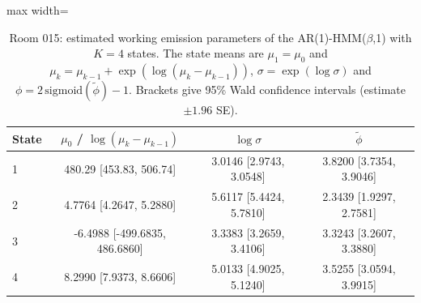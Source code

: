 \begin{table}[ht]
\centering
\begin{adjustbox}{max width=\textwidth}
\begin{tabular}{lccc}
\hline
State & $\mu_0$ / $\log(\mu_k - \mu_{k-1})$ & $\log \sigma$ & $\tilde{\phi}$ \\
\hline
1 & 480.29 [453.83, 506.74] & 3.0146 [2.9743, 3.0548] & 3.8200 [3.7354, 3.9046] \\
2 & 4.7764 [4.2647, 5.2880] & 5.6117 [5.4424, 5.7810] & 2.3439 [1.9297, 2.7581] \\
3 & -6.4988 [-499.6835, 486.6860] & 3.3383 [3.2659, 3.4106] & 3.3243 [3.2607, 3.3880] \\
4 & 8.2990 [7.9373, 8.6606] & 5.0133 [4.9025, 5.1240] & 3.5255 [3.0594, 3.9915] \\
\hline
\end{tabular}
\end{adjustbox}
\caption{Room 015: estimated working emission parameters of the AR(1)-HMM($\beta$,1) with $K=4$ states. The state means are $\mu_1 = \mu_0$ and $\mu_k = \mu_{k-1} + \exp(\log(\mu_k - \mu_{k-1}))$, $\sigma = \exp(\log \sigma)$ and $\phi = 2\,\mathrm{sigmoid}(\tilde{\phi}) - 1$. Brackets give 95\% Wald confidence intervals (estimate $\pm 1.96$ SE).}
\label{tab:params_working_emission_room_015_calibrated_anchor_ar1_hmm_beta_1_K4}
\end{table}
